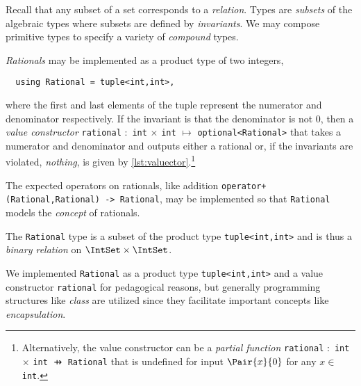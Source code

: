 \documentclass[ ../main.tex]{subfiles}
\begin{document}
Recall that any subset of a set corresponds to a \emph{relation}. Types are \emph{subsets} of the algebraic types where subsets are defined by \emph{invariants}.
We may compose primitive types to specify a variety of \emph{compound} types.
\begin{example}
\emph{Rationals} may be implemented as a product type of two integers,
\begin{verbatim}
  using Rational = tuple<int,int>,
\end{verbatim}
where the first and last elements of the tuple represent the numerator and denominator respectively.
If the invariant is that the denominator is not $0$, then a \emph{value constructor} \texttt{rational} $\colon$ \texttt{int} $\times$ \texttt{int} $\mapsto$ \texttt{optional<Rational>} that takes a numerator and denominator and outputs either a rational or, if the invariants are violated, \emph{nothing}, is given by \cref{lst:valuector}.\footnote{Alternatively, the value constructor can be a \emph{partial function} \texttt{rational} $\colon$ \texttt{int} $\times$ \texttt{int} $\pfun$ \texttt{Rational} that is undefined for input $\Pair{x}{0}$ for any $x \in$ \texttt{int}.}


The expected operators on rationals, like addition \texttt{operator+(Rational,Rational) -> Rational}, may be implemented so that \texttt{Rational} models the \emph{concept} of rationals.

The \texttt{Rational} type is a subset of the product type \texttt{tuple<int,int>} and is thus
a \emph{binary relation} on $\IntSet \times \IntSet$.
\begin{remark}
We implemented \texttt{Rational} as a product type \texttt{tuple<int,int>} and a value constructor \texttt{rational} for pedagogical reasons, but generally programming structures like \emph{class} are utilized since they facilitate important concepts like \emph{encapsulation}.
\end{remark}
\end{example}
\end{document}
